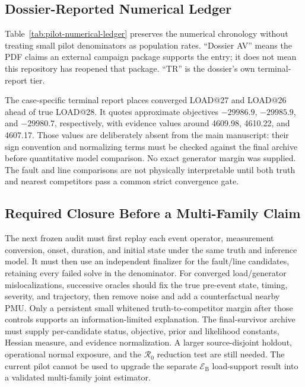 \subsection{Dossier-Reported Numerical Ledger}

Table~\ref{tab:pilot-numerical-ledger} preserves the numerical chronology without treating small pilot denominators as population rates. ``Dossier AV'' means the PDF claims an external campaign package supports the entry; it does not mean this repository has reopened that package. ``TR'' is the dossier's own terminal-report tier.



The case-specific terminal report places converged LOAD@27 and LOAD@26 ahead of true LOAD@28. It quotes approximate objectives $-29986.9$, $-29985.9$, and $-29980.7$, respectively, with evidence values around 4609.98, 4610.22, and 4607.17. Those values are deliberately absent from the main manuscript: their sign convention and normalizing terms must be checked against the final archive before quantitative model comparison. No exact generator margin was supplied. The fault and line comparisons are not physically interpretable until both truth and nearest competitors pass a common strict convergence gate.

\subsection{Required Closure Before a Multi-Family Claim}

The next frozen audit must first replay each event operator, measurement conversion, onset, duration, and initial state under the same truth and inference model. It must then use an independent finalizer for the fault/line candidates, retaining every failed solve in the denominator. For converged load/generator mislocalizations, successive oracles should fix the true pre-event state, timing, severity, and trajectory, then remove noise and add a counterfactual nearby PMU. Only a persistent small whitened truth-to-competitor margin after those controls supports an information-limited explanation. The final-survivor archive must supply per-candidate status, objective, prior and likelihood constants, Hessian measure, and evidence normalization. A larger source-disjoint holdout, operational normal exposure, and the $\mathcal R_0$ reduction test are still needed. The current pilot cannot be used to upgrade the separate $\mathcal E_{\mathrm B}$ load-support result into a validated multi-family joint estimator.
